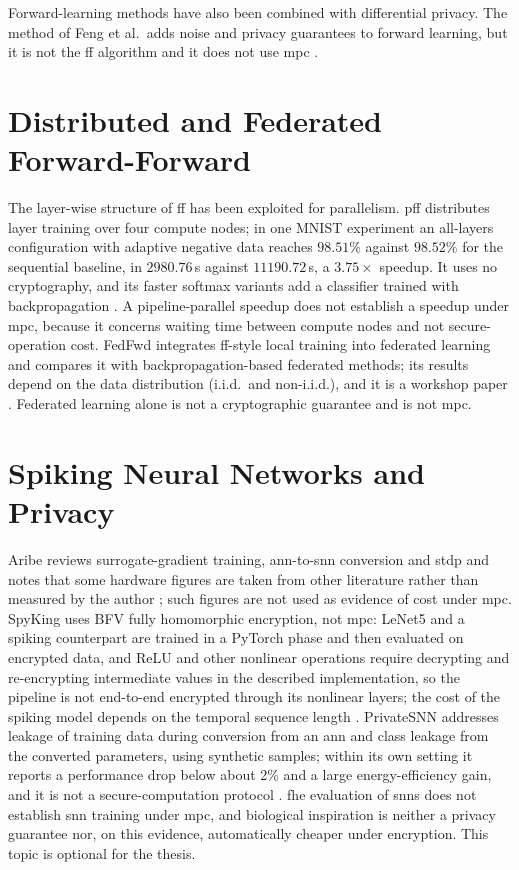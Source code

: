 Forward-learning methods have also been combined with differential privacy. The method of Feng et al.\ adds noise and privacy guarantees to forward learning, but it is not the \ac{ff} algorithm and it does not use \ac{mpc} \cite{feng2025fwdp}.

\section{Distributed and Federated Forward-Forward}\label{sec:lr-dist}
The layer-wise structure of \ac{ff} has been exploited for parallelism. \ac{pff} distributes layer training over four compute nodes; in one MNIST experiment an all-layers configuration with adaptive negative data reaches $98.51\%$ against $98.52\%$ for the sequential baseline, in $2980.76$\,s against $11190.72$\,s, a $3.75\times$ speedup. It uses no cryptography, and its faster softmax variants add a classifier trained with backpropagation \cite{aktemur2025pff}. A pipeline-parallel speedup does not establish a speedup under \ac{mpc}, because it concerns waiting time between compute nodes and not secure-operation cost. FedFwd integrates \ac{ff}-style local training into federated learning and compares it with backpropagation-based federated methods; its results depend on the data distribution (i.i.d.\ and non-i.i.d.), and it is a workshop paper \cite{park2023fedfwd}. Federated learning alone is not a cryptographic guarantee and is not \ac{mpc}.

\section{Spiking Neural Networks and Privacy}\label{sec:lr-snn}
Aribe reviews surrogate-gradient training, \ac{ann}-to-\ac{snn} conversion and \ac{stdp} and notes that some hardware figures are taken from other literature rather than measured by the author \cite{aribe2025snn}; such figures are not used as evidence of cost under \ac{mpc}. SpyKing uses BFV fully homomorphic encryption, not \ac{mpc}: LeNet5 and a spiking counterpart are trained in a PyTorch phase and then evaluated on encrypted data, and ReLU and other nonlinear operations require decrypting and re-encrypting intermediate values in the described implementation, so the pipeline is not end-to-end encrypted through its nonlinear layers; the cost of the spiking model depends on the temporal sequence length \cite{nikfam2025spyking}. PrivateSNN addresses leakage of training data during conversion from an \ac{ann} and class leakage from the converted parameters, using synthetic samples; within its own setting it reports a performance drop below about 2\% and a large energy-efficiency gain, and it is not a secure-computation protocol \cite{kim2022privatesnn}. \ac{fhe} evaluation of \acp{snn} does not establish \ac{snn} training under \ac{mpc}, and biological inspiration is neither a privacy guarantee nor, on this evidence, automatically cheaper under encryption. This topic is optional for the thesis.

